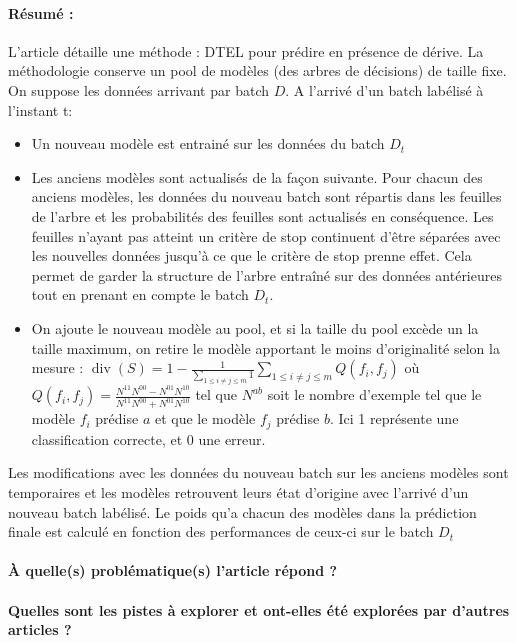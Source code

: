\documentclass[11pt,a4paper]{report}
\begin{document}
\paragraph{Résumé :} L'article détaille une méthode : DTEL pour prédire en présence de dérive. La méthodologie conserve un pool de modèles (des arbres de décisions) de taille fixe. On suppose les données arrivant par batch $D$. 
A l'arrivé d'un batch labélisé à l'instant t: 
\begin{itemize}
	\item Un nouveau modèle est entrainé sur les données du batch $D_t$
	\item Les anciens modèles sont actualisés de la façon suivante. Pour chacun des anciens modèles, les données du nouveau batch sont répartis dans les feuilles de l'arbre et les probabilités des feuilles sont actualisés en conséquence. Les feuilles n'ayant pas atteint un critère de stop continuent d'être séparées avec les nouvelles données jusqu'à ce que le critère de stop prenne effet. Cela permet de garder la structure de l'arbre entraîné sur des données antérieures tout en prenant en compte le batch $D_t$.
	\item  On ajoute le nouveau modèle au pool, et si la taille du pool excède un la taille maximum, on retire le modèle apportant le moins d'originalité selon la mesure : $\operatorname{div}(S)=1-\frac{1}{\sum_{1 \leq i \neq j \leq m} 1} \sum_{1 \leq i \neq j \leq m} Q\left(f_{i}, f_{j}\right)$ où $Q\left(f_{i}, f_{j}\right)=\frac{N^{11} N^{00}-N^{01} N^{10}}{N^{11} N^{00}+N^{01} N^{10}}$ tel que $N^{ab}$ soit le nombre d'exemple tel que le modèle $f_i$ prédise $a$ et que le modèle $f_j$ prédise $b$. Ici 1 représente une classification correcte, et 0 une erreur.
\end{itemize}

Les  modifications avec les données du nouveau batch sur les anciens modèles sont temporaires et les modèles retrouvent leurs état d'origine avec l'arrivé d'un nouveau batch labélisé. Le poids qu'a chacun des modèles dans la prédiction finale est calculé en fonction des performances de ceux-ci sur le batch $D_t$

\paragraph{À quelle(s) problématique(s) l'article répond ?} 

\paragraph{Quelles sont les pistes à explorer et ont-elles  été explorées par d'autres articles ?} 




\newpage
\end{document}
